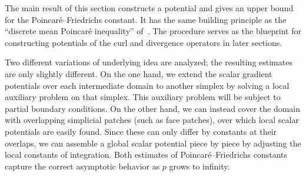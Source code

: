 \documentclass[10pt,a4paper]{article}
\begin{document}




The main result of this section constructs a potential and gives an upper bound for the Poincar\'e--Friedrichs constant.  
It has the same building principle as the ``discrete mean Poincar\'e inequality'' of~\cite[Lemma~3.7]{Eym_Gal_Her_00}.
The procedure serves as the blueprint for constructing potentials of the curl and divergence operators in later sections. 

Two different variations of underlying idea are analyzed; the resulting estimates are only slightly different.  
On the one hand, we extend the scalar gradient potentials over each intermediate domain to another simplex by solving a local auxiliary problem on that simplex. This auxiliary problem will be subject to partial boundary conditions. 
On the other hand, we can instead cover the domain with overlapping simplicial patches (such as face patches), over which local scalar potentials are easily found. Since these can only differ by constants at their overlaps, we can assemble a global scalar potential piece by piece by adjusting the local constants of integration. 
Both estimates of Poincar\'e--Friedrichs constants capture the correct asymptotic behavior as $p$ grows to infinity.
\end{document}

